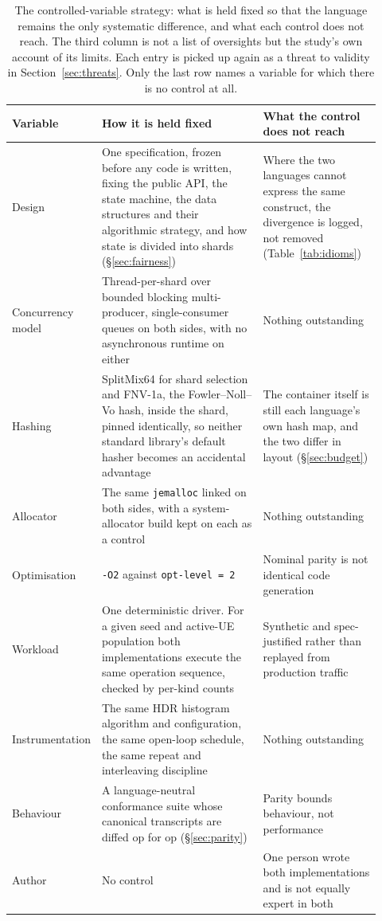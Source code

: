 \documentclass[english,oneside,a4paper,censored,csm,software-track-2020]{HYthesisML}
\renewcommand{\arraystretch}{0.95}
\begin{document}
\begin{table}[H]
\centering
\small
\caption[The controlled-variable strategy]{The controlled-variable strategy: what is held fixed so that the language remains the
only systematic difference, and what each control does not reach. The third column is not a
list of oversights but the study's own account of its limits. Each entry is picked up again as
a threat to validity in Section~\ref{sec:threats}. Only the last row names a variable for
which there is no control at all.\label{tab:controls}}
\footnotesize
\renewcommand{\arraystretch}{1.15}
\begin{tabular}{@{}R{0.16\linewidth} R{0.44\linewidth} R{0.32\linewidth}@{}}
\hline\hline
Variable & How it is held fixed & What the control does not reach \\
\hline
Design & One specification, frozen before any code is written, fixing the public API, the state machine, the data structures and their algorithmic strategy, and how state is divided into shards (\S\ref{sec:fairness}) & Where the two languages cannot express the same construct, the divergence is logged, not removed (Table~\ref{tab:idioms}) \\
Concurrency model & Thread-per-shard over bounded blocking multi-producer, single-consumer queues on both sides, with no asynchronous runtime on either & Nothing outstanding \\
Hashing & SplitMix64 for shard selection and FNV-1a, the Fowler--Noll--Vo hash, inside the shard, pinned identically, so neither standard library's default hasher becomes an accidental advantage & The container itself is still each language's own hash map, and the two differ in layout (\S\ref{sec:budget}) \\
Allocator & The same \texttt{jemalloc} linked on both sides, with a system-allocator build kept on each as a control & Nothing outstanding \\
Optimisation & \texttt{-O2} against \texttt{opt-level~=~2} & Nominal parity is not identical code generation \\
Workload & One deterministic driver. For a given seed and active-UE population both implementations execute the same operation sequence, checked by per-kind counts & Synthetic and spec-justified rather than replayed from production traffic \\
Instrumentation & The same HDR histogram algorithm and configuration, the same open-loop schedule, the same repeat and interleaving discipline & Nothing outstanding \\
Behaviour & A language-neutral conformance suite whose canonical transcripts are diffed op for op (\S\ref{sec:parity}) & Parity bounds behaviour, not performance \\
\hline
Author & No control & One person wrote both implementations and is not equally expert in both \\
\hline
\end{tabular}
\end{table}
\end{document}
